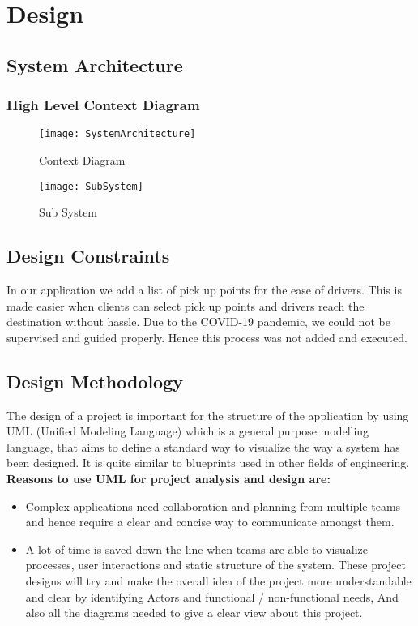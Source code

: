 \chapter{Design} \label{chap:design}


\section*{}
\section{System Architecture}
  
\subsection{High Level Context Diagram}
\begin{figure}[ht]
\center
\texttt{[image: SystemArchitecture]}
\caption{Context Diagram}
\label{fig:Context Diagram}
\end{figure}
\begin{figure}[ht]
\center
\texttt{[image: SubSystem]}
\caption{Sub System}
\label{fig:SubSystem}
\end{figure}

\section{Design Constraints} 
In our application we add a list of pick up points for the ease of drivers. This is made easier when clients can select pick up points and drivers reach the destination without hassle. Due to the COVID-19 pandemic, we could not be supervised and guided properly. Hence this process was not added and executed.
\section{Design Methodology}
The design of a project is important for the structure of the application by using UML (Unified Modeling Language) which is a general purpose modelling language, that aims to define a standard way to visualize the way a system has been designed. It is quite similar to blueprints used in other fields of engineering.
\\ \textbf{Reasons to use UML for project analysis and design are:} 

\begin{itemize}
\item Complex applications need collaboration and planning from multiple teams and hence require a clear and concise way to communicate amongst them.
\item A lot of time is saved down the line when teams are able to visualize processes, user interactions and static structure of the system.
These project designs will try and make the overall idea of the project more
understandable and clear by identifying Actors and functional / non-functional needs,
And also all the diagrams needed to give a clear view about this project.

\end{itemize}
